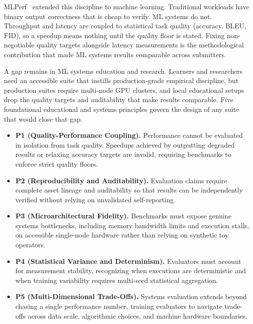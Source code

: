 \documentclass[10pt,twocolumn]{article}
\begin{document}
MLPerf~\citep{mattson2020,reddi2020mlperf} extended this discipline to machine learning. Traditional workloads have binary output correctness that is cheap to verify. ML systems do not. Throughput and latency are coupled to statistical task quality (accuracy, BLEU, FID), so a speedup means nothing until the quality floor is stated. Fixing non-negotiable quality targets alongside latency measurements is the methodological contribution that made ML systems results comparable across submitters.

A gap remains in ML systems education and research. Learners and researchers need an accessible suite that instills production-grade empirical discipline, but production suites require multi-node GPU clusters, and local educational setups drop the quality targets and auditability that make results comparable. Five foundational educational and systems principles govern the design of any suite that would close that gap.
\begin{itemize}[leftmargin=*,itemsep=1.5pt]
\item \textbf{P1 (Quality-Performance Coupling).} Performance cannot be evaluated in isolation from task quality. Speedups achieved by outputting degraded results or relaxing accuracy targets are invalid, requiring benchmarks to enforce strict quality floors.
\item \textbf{P2 (Reproducibility and Auditability).} Evaluation claims require complete asset lineage and auditability so that results can be independently verified without relying on unvalidated self-reporting.
\item \textbf{P3 (Microarchitectural Fidelity).} Benchmarks must expose genuine systems bottlenecks, including memory bandwidth limits and execution stalls, on accessible single-node hardware rather than relying on synthetic toy operators.
\item \textbf{P4 (Statistical Variance and Determinism).} Evaluators must account for measurement stability, recognizing when executions are deterministic and when training variability requires multi-seed statistical aggregation.
\item \textbf{P5 (Multi-Dimensional Trade-Offs).} Systems evaluation extends beyond chasing a single performance number, training evaluators to navigate trade-offs across data scale, algorithmic choices, and machine hardware boundaries.
\end{itemize}
\end{document}
